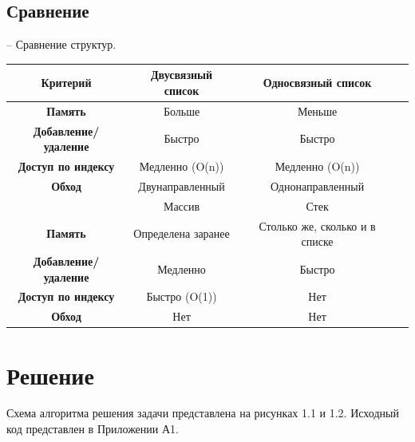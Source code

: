 \documentclass[oneside,a4paper,14pt]{extarticle}
\begin{document}
\subsection*{Сравнение}
 – Сравнение структур.\\
\begin{tabular}{|c|c|c|c|}
	\hline
	Критерий                     & Двусвязный список  & Односвязный список             \\
	\hline
	\textbf{Память}              & Больше             & Меньше                         \\
	\textbf{Добавление/удаление} & Быстро             & Быстро                         \\
	\textbf{Доступ по индексу}   & Медленно (O(n))    & Медленно (O(n))                \\
	\textbf{Обход}               & Двунаправленный    & Однонаправленный               \\
	\hline
	                             & Массив             & Стек                           \\
	\hline
	\textbf{Память}              & Определена заранее & Столько же, сколько и в списке \\
	\textbf{Добавление/удаление} & Медленно           & Быстро                         \\
	\textbf{Доступ по индексу}   & Быстро (O(1))      & Нет                            \\
	\textbf{Обход}               & Нет                & Нет                            \\
    \hline
\end{tabular}

\section*{Решение}

Схема алгоритма решения задачи представлена на рисунках 1.1 и 1.2. Исходный код представлен в Приложении А1.
\end{document}
